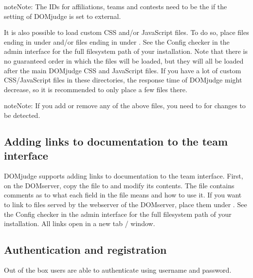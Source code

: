 \documentclass[a4paper,10pt,english,openany]{sphinxmanual}
\begin{document}
\begin{sphinxadmonition}{note}{Note:}
\sphinxAtStartPar
The IDs for affiliations, teams and contests need to be the 
if the  setting of DOMjudge is set to external.
\end{sphinxadmonition}

\sphinxAtStartPar
It is also possible to load custom CSS and/or JavaScript files. To do so, place
files ending in  under  and/or files ending in 
under . See the Config checker in the admin interface for the
full filesystem path of your installation. Note that there is no guaranteed
order in which the files will be loaded, but they will all be loaded after the
main DOMjudge CSS and JavaScript files. If you have a lot of custom CSS/JavaScript
files in these directories, the response time of DOMjudge might decrease, so it
is recommended to only place a few files there.

\begin{sphinxadmonition}{note}{Note:}
\sphinxAtStartPar
If you add or remove any of the above files, you need to
{\hyperref[\detokenize{config-advanced:clear-cache}]{}} for changes to be detected.
\end{sphinxadmonition}


\subsection{Adding links to documentation to the team interface}
\label{\detokenize{config-advanced:adding-links-to-documentation-to-the-team-interface}}
\sphinxAtStartPar
DOMjudge supports adding links to documentation to the team interface.
First, on the DOMserver, copy the file  to
 and modify its contents. The  file contains
comments as to what each field in the file means and how to use it. If you
want to link to files served by the webserver of the DOMserver, place them
under . See the Config checker in the admin interface for
the full filesystem path of your installation. All links open in a new
tab / window.


\subsection{Authentication and registration}
\label{\detokenize{config-advanced:authentication-and-registration}}\label{\detokenize{config-advanced:authentication}}
\sphinxAtStartPar
Out of the box users are able to authenticate using username and password.
\end{document}
